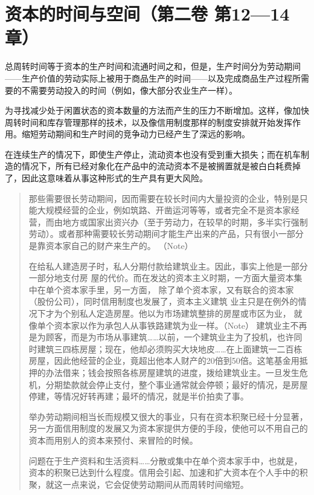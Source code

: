 \chapter{资本的时间与空间（第二卷 第12—14章）}

总周转时间等于资本的生产时间和流通时间之和，但是，生产时间分为劳动期间——生产价值的劳动实际上被用于商品生产的时间——以及完成商品生产过程所需要的不需要劳动投入的时间（例如，像大部分农业生产一样）。

为寻找减少处于闲置状态的资本数量的方法而产生的压力不断增加。这样，像加快周转时间和库存管理那样的技术，以及像信用制度那样的制度安排就开始发挥作用。缩短劳动期间和生产时间的竞争动力已经产生了深远的影响。

在连续生产的情况下，即使生产停止，流动资本也没有受到重大损失；而在机车制造的情况下，所有已经对象化在产品中的流动资本不是被搁置就是被白白耗费掉了，因此这意味着从事这种形式的生产具有更大风险。

\begin{quotation}
那些需要很长劳动期间，因而需要在较长时间内大量投资的企业，特别是只能大规模经营的企业，例如筑路、开凿运河等等，或者完全不是资本家经营，而由地方或国家出资兴办（至于劳动力，在较早的时期，多半实行强制劳动）。或者那种需要较长劳动期间才能生产出来的产品，只有很小一部分是靠资本家自己的财产来生产的。 （Note）

在给私人建造房子时，私人分期付款给建筑业主。因此，事实上他是一部分一部分地支付房
屋的代价。而在发达的资本主义时期，一方面大量资本集中在单个资本家手里，另一方面，
除了单个资本家，又有联合的资本家（股份公司），同时信用制度也发展了，资本主义建筑
业主只是在例外的情况下才为个别私人定造房屋。他以为市场建筑整排的房屋或市区为业，
就像单个资本家以作为承包人从事铁路建筑为业一样。（Note）
建筑业主不再是为顾客，而是为市场从事建筑……以前，一个建筑业主为了投机，也许同时建筑三四栋房屋；现在，他却必须购买大块地皮……在上面建筑一二百栋房屋，因此他经营的企业，竟超出他本人财产的20倍到50倍。这笔基金用抵押的办法借来；钱会按照各栋房屋建筑的进度，拨给建筑业主。一旦发生危机，分期垫款就会停止支付，整个事业通常就会停顿；最好的情况，是房屋停建，等情况好转再建；最坏的情况，就是半价拍卖了事。 

举办劳动期间相当长而规模又很大的事业，只有在资本积聚已经十分显著，另一方面信用制度的发展又为资本家提供方便的手段，使他可以不用自己的资本而用别人的资本来预付、来冒险的时候。

问题在于生产资料和生活资料……分散或集中在单个资本家手中，也就是，资本的积聚已达到什么程度。信用会引起、加速和扩大资本在个人手中的积聚，就这一点来说，它会促使劳动期间从而周转时间缩短。 

\end{quotation}

